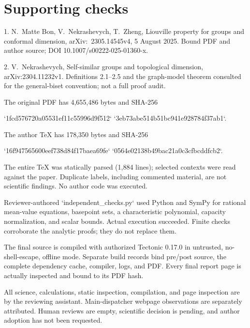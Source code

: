 \documentclass[10pt]{article}
\begin{document}
\section*{Supporting checks}
1. N. Matte Bon, V. Nekrashevych, T. Zheng, Liouville property for groups and conformal dimension, arXiv: 2305.14545v4, 5 August 2025. Bound PDF and author source; DOI 10.1007/s00222-025-01360-x.\par
2. V. Nekrashevych, Self-similar groups and topological dimension, arXiv:2304.11232v1. Definitions 2.1–2.5 and the graph-model theorem consulted for the general-biset convention; not a full proof audit.\par
The original PDF has 4,655,486 bytes and SHA-256\par
`1fcd576720a05531ef11c55996d9f512` `3eb73abe514b51bc941e928784f37ab1`.\par
The author TeX has 178,350 bytes and SHA-256\par
`16f947565600eef738d84f17baea69fe` `0564e02138b49bac21a0c3cfbcddfcb2`.\par
The entire TeX was statically parsed (1,884 lines); selected contexts were read against the paper. Duplicate labels, including commented material, are not scientific findings. No author code was executed.\par
Reviewer-authored `independent\_checks.py` used Python and SymPy for rational mean-value equations, basepoint sets, a characteristic polynomial, capacity normalization, and scalar bounds. Actual execution succeeded. Finite checks corroborate the analytic proofs; they do not replace them.\par
The final source is compiled with authorized Tectonic 0.17.0 in untrusted, no-shell-escape, offline mode. Separate build records bind pre/post source, the complete dependency cache, compiler, logs, and PDF. Every final report page is actually inspected and bound to its PDF hash.\par
All science, calculations, static inspection, compilation, and page inspection are by the reviewing assistant. Main-dispatcher webpage observations are separately attributed. Human reviews are empty, scientific decision is pending, and author adoption has not been requested.\par
\end{document}
